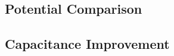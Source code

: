 \documentclass[a4paper,titlepage]{article}
\begin{document}
	\subsection{Potential Comparison}
	
	\subsection{Capacitance Improvement}
	
%
	
	\onecolumn
	
\end{document}
